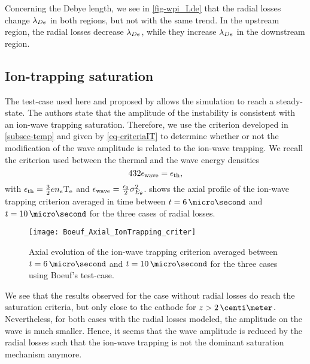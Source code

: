 Concerning the Debye length, we see in \cref{fig-wpi_Lde} that the radial losses change $\lambda_{De}$ in both regions, but not with the same trend.
In the upstream region, the radial losses decrease $\lambda_{De}$, while they increase $\lambda_{De}$ in the downstream region.


\subsection{Ion-trapping saturation } \label{subsec-boeuf_iontrapping}

The test-case used here and proposed by \citet{boeuf2018} allows the simulation to reach a steady-state.
The authors state that the amplitude of the instability is consistent with an ion-wave trapping saturation.
Therefore, we use the criterion developed in \cref{subsec-temp} and given by \cref{eq-criteriaIT} to determine whether or not the modification of the wave amplitude is related to the ion-wave trapping.
We recall the criterion used between the thermal and the wave energy densities
\begin{equation} 
  432 \epsilon_{\rm wave} = \epsilon_{\rm th},
\end{equation}
with $\epsilon_{\rm th} = \frac{3}{2} e n_e \mathrm{T_e}$ and $\epsilon_{\rm wave} = \frac{\epsilon_0}{2} \sigma_{E_{\theta}}^2$.
 shows the axial profile of the ion-wave trapping criterion averaged in time between $t=6\,\micro\second$ and $t=10\,\micro\second$ for the three cases of radial losses.

\begin{figure}[hbt]
  \centering
  \texttt{[image: Boeuf\_Axial\_IonTrapping\_criter]}
  \caption{Axial evolution of the ion-wave trapping criterion averaged between $t=6\,\micro\second$ and $t=10\,\micro\second$ for the three cases using Boeuf's test-case. }
  \label{fig-ionwavetrapping_axial}
\end{figure}

We see that the results observed for the case without radial losses do reach the saturation criteria, but only close to the cathode for $z > 2\,\centi\meter$.
Nevertheless, for both cases with the radial losses modeled, the amplitude on the wave is much smaller.
Hence, it seems that the wave amplitude is reduced by the radial losses such that the ion-wave trapping is not the dominant saturation mechanism anymore.



